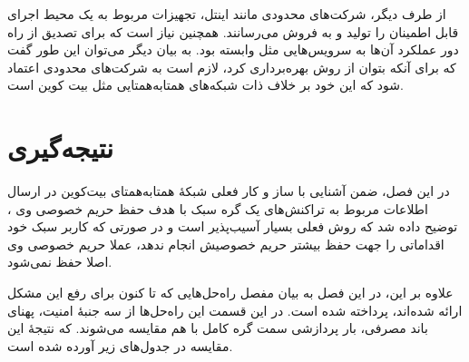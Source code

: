 از طرف دیگر، شرکت‌های محدودی مانند اینتل، تجهیزات مربوط به یک محیط اجرای قابل اطمینان را تولید و به فروش می‌رسانند. همچنین نیاز است که برای  تصدیق از راه دور عملکرد آن‌ها به سرویس‌هایی مثل \cite{EPID} وابسته بود. به بیان دیگر می‌توان این طور گفت که برای آنکه بتوان از روش \cite{Matetic2019} بهره‌برداری کرد، لازم است به شرکت‌های محدودی اعتماد شود که این خود بر خلاف ذات شبکه‌های همتابه‌همتایی مثل بیت کوین است.



\section{نتیجه‌گیری}

در این فصل، ضمن آشنایی با ساز و کار فعلی شبکه‌ٔ همتا‌به‌همتای بیت‌کوین در ارسال اطلاعات مربوط به تراکنش‌های یک گره سبک با هدف حفظ حریم خصوصی وی \cite{Hearn2013}، توضیح داده شد که روش فعلی بسیار آسیب‌پذیر است و در صورتی که کاربر سبک خود اقداماتی را جهت حفظ بیشتر حریم خصوصیش انجام ندهد، عملا حریم خصوصی وی اصلا حفظ نمی‌شود.

علاوه بر این، در این فصل به بیان مفصل راه‌حل‌هایی که تا کنون برای رفع این مشکل ارائه شده‌اند، پرداخته شده است. در این قسمت این راه‌حل‌ها از سه جنبهٔ امنیت، پهنای باند مصرفی، بار پردازشی سمت گره کامل با هم مقایسه می‌شوند. که نتیجهٔ این مقایسه در جدول‌های زیر آورده شده است.

